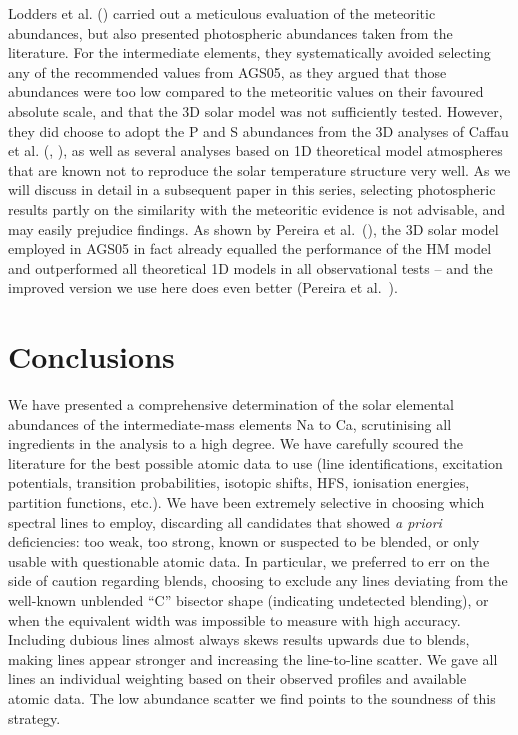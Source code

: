 \documentclass[traditabstract]{aa}
\begin{document}
Lodders et al. (\cite{lodd}) carried out a meticulous evaluation of the meteoritic abundances, but also presented photospheric abundances taken from the literature. For the intermediate elements, they systematically avoided selecting any of the recommended values from AGS05, as they argued that those abundances were too low compared to the meteoritic values on their favoured absolute scale, and that the 3D solar model was not sufficiently tested. However, they did choose to adopt the P and S abundances from the 3D analyses of Caffau et al. (\cite{caf1}, \cite{caf2}), as well as several analyses based on 1D theoretical model atmospheres that are known not to reproduce the solar temperature structure very well. As we will discuss in detail in a subsequent paper in this series, selecting photospheric results partly on the similarity with the meteoritic evidence is not advisable, and may easily prejudice findings. As shown by Pereira et al.\ (\cite{pereira_o}), the 3D solar model employed in AGS05 in fact already equalled the performance of the HM model and outperformed all theoretical 1D models in all observational tests -- and the improved version we use here does even better (Pereira et al.\ \cite{pereira_models}).


\section{Conclusions}
\label{s:conclusion}

We have presented a comprehensive determination of the solar elemental abundances of the intermediate-mass elements Na to Ca, scrutinising all ingredients in the analysis to a high degree. We have carefully scoured the literature for the best possible atomic data to use (line identifications, excitation potentials, transition probabilities, isotopic shifts, HFS, ionisation energies, partition functions, etc.).  We have been extremely selective in choosing which spectral lines to employ, discarding all candidates that showed \textit{a priori} deficiencies: too weak, too strong, known or suspected to be blended, or only usable with questionable atomic data. In particular, we preferred to err on the side of caution regarding blends, choosing to exclude any lines deviating from the well-known unblended ``C'' bisector shape (indicating undetected blending), or when the equivalent width was impossible to measure with high accuracy.  Including dubious lines almost always skews results upwards due to blends, making lines appear stronger and increasing the line-to-line scatter.  We gave all lines an individual weighting based on their observed profiles and available atomic data.  The low abundance scatter we find points to the soundness of this strategy.
\end{document}
